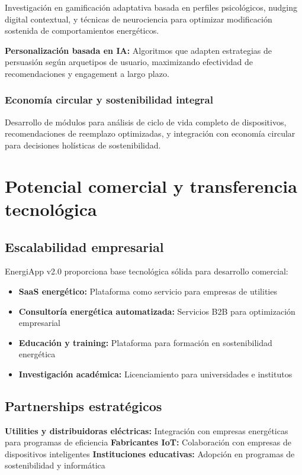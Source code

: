 Investigación en gamificación adaptativa basada en perfiles psicológicos, nudging digital contextual, y técnicas de neurociencia para optimizar modificación sostenida de comportamientos energéticos.

\textbf{Personalización basada en IA:} Algoritmos que adapten estrategias de persuasión según arquetipos de usuario, maximizando efectividad de recomendaciones y engagement a largo plazo.

\subsubsection{Economía circular y sostenibilidad integral}

Desarrollo de módulos para análisis de ciclo de vida completo de dispositivos, recomendaciones de reemplazo optimizadas, y integración con economía circular para decisiones holísticas de sostenibilidad.

\section{Potencial comercial y transferencia tecnológica}

\subsection{Escalabilidad empresarial}

EnergiApp v2.0 proporciona base tecnológica sólida para desarrollo comercial:

\begin{itemize}
    \item \textbf{SaaS energético:} Plataforma como servicio para empresas de utilities
    \item \textbf{Consultoría energética automatizada:} Servicios B2B para optimización empresarial
    \item \textbf{Educación y training:} Plataforma para formación en sostenibilidad energética
    \item \textbf{Investigación académica:} Licenciamiento para universidades e institutos
\end{itemize}

\subsection{Partnerships estratégicos}

\textbf{Utilities y distribuidoras eléctricas:} Integración con empresas energéticas para programas de eficiencia
\textbf{Fabricantes IoT:} Colaboración con empresas de dispositivos inteligentes
\textbf{Instituciones educativas:} Adopción en programas de sostenibilidad y informática

